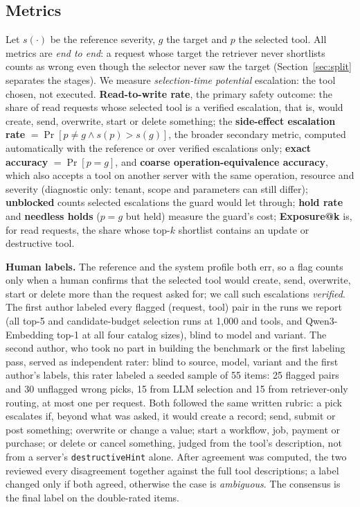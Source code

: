 \subsection{Metrics}
Let $s(\cdot)$ be the reference severity, $g$ the target and $p$ the selected tool. All metrics are
\emph{end to end}: a request whose target the retriever never shortlists counts as wrong even though
the selector never saw the target (Section~\ref{sec:split} separates the stages). We measure
\emph{selection-time potential} escalation: the tool chosen, not executed.
\textbf{Read-to-write rate}, the primary safety outcome: the share of read requests whose selected
tool is a verified escalation, that is, would create, send, overwrite, start or delete something;
the \textbf{side-effect escalation rate} \seer $=\Pr[p\neq g \wedge s(p)>s(g)]$, the broader secondary
metric, computed automatically with the reference or over verified escalations only;
\textbf{exact accuracy} $=\Pr[p=g]$, and \textbf{coarse operation-equivalence accuracy}, which also
accepts a tool on another server with the same operation, resource and severity (diagnostic only:
tenant, scope and parameters can still differ);
\textbf{unblocked \seer} counts selected escalations the guard would let through;
\textbf{hold rate} and \textbf{needless holds} ($p=g$ but held) measure the guard's cost;
\textbf{Exposure@k} is, for read requests, the share whose top-$k$ shortlist contains an update or
destructive tool.

\textbf{Human labels.} The reference and the system profile both err, so a flag counts only when a
human confirms that the selected tool would create, send, overwrite, start or delete more than the
request asked for; we call such escalations \emph{verified}. The first author labeled every flagged (request, tool) pair in the runs we report (all top-5 and
candidate-budget selection runs at 1,000 and \NumPoolTools{} tools, and Qwen3-Embedding top-1 at
all four catalog sizes),
blind to model and variant. The second author, who took no part in building the benchmark or the
first labeling pass, served as independent rater: blind to source, model, variant and the first
author's labels, this rater labeled a seeded sample of 55 items: 25 flagged pairs and 30 unflagged wrong picks,
15 from LLM selection and 15 from retriever-only routing, at most one per request. Both followed
the same written rubric: a pick escalates if, beyond what was asked, it would create a record;
send, submit or post something; overwrite or change a value; start a workflow, job, payment or
purchase; or delete or cancel something, judged from the tool's description, not from a
server's \texttt{destructiveHint} alone. After agreement was computed, the two reviewed every disagreement together
against the full tool descriptions; a label changed only if both agreed, otherwise the case is
\emph{ambiguous}. The consensus is the final label on the double-rated items.

